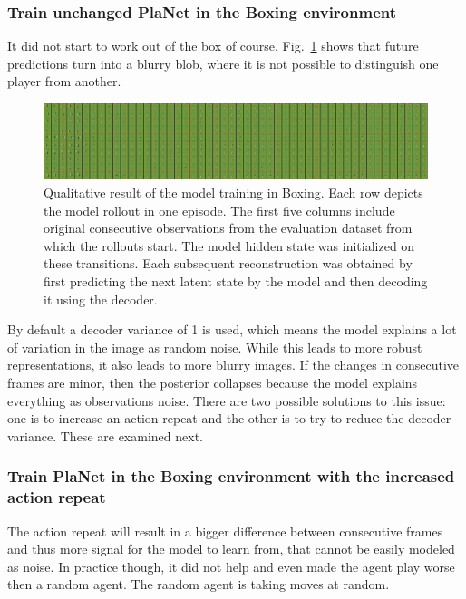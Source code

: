 \subsubsection{Train unchanged PlaNet in the Boxing environment}

It did not start to work out of the box of course. Fig.~\ref{Fig.PlaNet_Boxing_original} shows that future predictions turn into a blurry blob, where it is not possible to distinguish one player from another.

\begin{figure}[H]
\includegraphics[width=1\textwidth,keepaspectratio]{figures/PlaNet/Boxing_memory_original.png}
\caption[Qualitative result of the original PlaNet model training in Boxing]{Qualitative result of the model training in Boxing. Each row depicts the model rollout in one episode. The first five columns include original consecutive observations from the evaluation dataset from which the rollouts start. The model hidden state was initialized on these transitions. Each subsequent reconstruction was obtained by first predicting the next latent state by the model and then decoding it using the decoder.}
\label{Fig.PlaNet_Boxing_original}
\end{figure}

By default a decoder variance of 1 is used, which means the model explains a lot of variation in the image as random noise. While this leads to more robust representations, it also leads to more blurry images. If the changes in consecutive frames are minor, then the posterior collapses because the model explains everything as observations noise. There are two possible solutions to this issue: one is to increase an action repeat and the other is to try to reduce the decoder variance. These are examined next.

\subsubsection{Train PlaNet in the Boxing environment with the increased action repeat}

The action repeat will result in a bigger difference between consecutive frames and thus more signal for the model to learn from, that cannot be easily modeled as noise. In practice though, it did not help and even made the agent play worse then a random agent. The random agent is taking moves at random.


